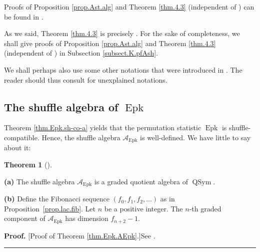 \documentclass[numbers=enddot,12pt,final,onecolumn,notitlepage]{scrartcl}%
\theoremstyle{definition}
\newtheorem{theo}{Theorem}[section]
\newenvironment{theorem}[1][]
{\begin{theo}[#1]\begin{leftbar}}
{\end{leftbar}\end{theo}}
\newenvironment{proof}[1][Proof]{\noindent\textbf{#1.} }{\ \rule{0.5em}{0.5em}}
\newenvironment{verlong}{}{}
\newenvironment{vershort}{}{}
\newenvironment{noncompile}{}{}
\begin{document}
\begin{vershort}
Proofs of Proposition \ref{prop.Ast.alg} and Theorem \ref{thm.4.3}
(independent of \cite{part1}) can be found in \cite{verlong}.
\end{vershort}

\begin{verlong}
As we said, Theorem \ref{thm.4.3} is precisely \cite[Theorem 4.3]{part1}.
For the sake of completeness, we shall give proofs of Proposition
\ref{prop.Ast.alg} and Theorem \ref{thm.4.3} (independent of \cite{part1}) in
Subsection \ref{subsect.K.pfAsh}.
\end{verlong}

\begin{noncompile}
We shall perhaps also use some other notations that were introduced in
\cite{part1}. The reader should thus consult \cite{part1} for unexplained notations.
\end{noncompile}

\subsection{The shuffle algebra of $\operatorname{Epk}$}

Theorem \ref{thm.Epk.sh-co-a} yields that the permutation statistic
$\operatorname{Epk}$ is shuffle-compatible. Hence, the shuffle algebra
$\mathcal{A}_{\operatorname{Epk}}$ is well-defined. We have little to say
about it:

\begin{theorem}
\label{thm.Epk.AEpk}\textbf{(a)} The shuffle algebra $\mathcal{A}%
_{\operatorname{Epk}}$ is a graded quotient algebra of $\operatorname*{QSym}$.

\textbf{(b)} Define the Fibonacci sequence
$\left(  f_{0},f_{1},f_{2},\ldots\right)  $ as in
Proposition~\ref{prop.lac.fib}.
Let $n$ be a positive integer. The $n$-th graded component of
$\mathcal{A}_{\operatorname{Epk}}$ has dimension $f_{n+2}-1$.
\end{theorem}

\begin{vershort}
\begin{proof}
[Proof of Theorem \ref{thm.Epk.AEpk}.]See \cite{verlong}.
\end{proof}
\end{vershort}
\end{document}
